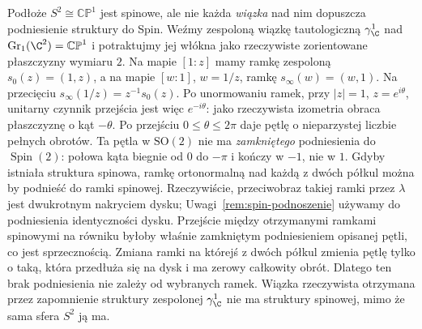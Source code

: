 \begin{przyklad}
\label{prz:nie-spin-linia}
Podłoże $S^2\cong\mathbb{CP}^1$ jest spinowe,
ale nie każda \emph{wiązka} nad nim dopuszcza
podniesienie struktury do Spin.
Weźmy zespoloną wiązkę tautologiczną
$\gamma^1_\C$ nad
$\operatorname{Gr}_1(\C^2)=\mathbb{CP}^1$
i potraktujmy jej włókna jako rzeczywiste
zorientowane płaszczyzny wymiaru $2$.
Na mapie $[1:z]$ mamy ramkę zespoloną
$s_0(z)=(1,z)$, a na mapie $[w:1]$,
$w=1/z$, ramkę $s_\infty(w)=(w,1)$.
Na przecięciu
$s_\infty(1/z)=z^{-1}s_0(z)$.
Po unormowaniu ramek, przy $|z|=1$, $z=e^{i\theta}$, unitarny
czynnik przejścia jest więc $e^{-i\theta}$:
jako rzeczywista izometria obraca płaszczyznę
o kąt $-\theta$. Po przejściu
$0\leq\theta\leq2\pi$ daje pętlę
o nieparzystej liczbie pełnych obrotów.
Ta pętla w $\mathrm{SO}(2)$ nie ma
\emph{zamkniętego} podniesienia do $\operatorname{Spin}(2)$:
połowa kąta biegnie
od $0$ do $-\pi$ i kończy w $-1$, nie w $1$.
Gdyby istniała struktura spinowa, ramkę ortonormalną nad każdą
z dwóch półkul można by podnieść do ramki spinowej.
Rzeczywiście, przeciwobraz takiej ramki przez $\lambda$ jest
dwukrotnym nakryciem dysku; Uwagi~\ref{rem:spin-podnoszenie}
używamy do podniesienia identyczności dysku. Przejście między
otrzymanymi ramkami spinowymi na równiku byłoby właśnie
zamkniętym podniesieniem opisanej pętli, co jest sprzecznością.
Zmiana ramki na którejś z dwóch półkul
zmienia pętlę tylko o taką, która przedłuża
się na dysk i ma zerowy całkowity obrót.
Dlatego ten brak podniesienia nie zależy
od wybranych ramek. Wiązka rzeczywista otrzymana przez zapomnienie
struktury zespolonej $\gamma^1_\C$ nie ma struktury
spinowej, mimo że sama sfera $S^2$ ją ma.
\end{przyklad}

